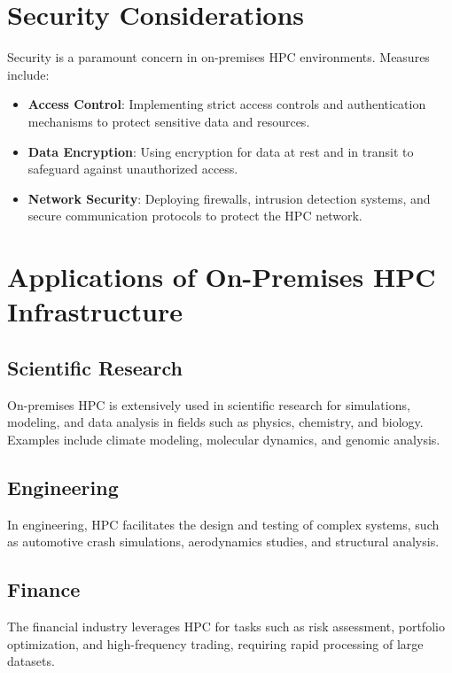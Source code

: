 \section{Security Considerations}

Security is a paramount concern in on-premises HPC environments. Measures include:

\begin{itemize}
    \item \textbf{Access Control}: Implementing strict access controls and authentication mechanisms to protect sensitive data and resources.
    \item \textbf{Data Encryption}: Using encryption for data at rest and in transit to safeguard against unauthorized access.
    \item \textbf{Network Security}: Deploying firewalls, intrusion detection systems, and secure communication protocols to protect the HPC network.
\end{itemize}

\section{Applications of On-Premises HPC Infrastructure}

\subsection{Scientific Research}

On-premises HPC is extensively used in scientific research for simulations, modeling, and data analysis in fields such as physics, chemistry, and biology. Examples include climate modeling, molecular dynamics, and genomic analysis.

\subsection{Engineering}

In engineering, HPC facilitates the design and testing of complex systems, such as automotive crash simulations, aerodynamics studies, and structural analysis.

\subsection{Finance}

The financial industry leverages HPC for tasks such as risk assessment, portfolio optimization, and high-frequency trading, requiring rapid processing of large datasets.

